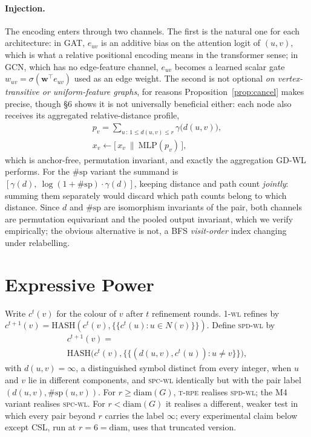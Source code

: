 \documentclass[11pt]{article}
\newcommand{\WL}{\textsc{1-wl}}
\newcommand{\SPD}{\textsc{spd-wl}}
\newcommand{\SPC}{\textsc{spc-wl}}
\newcommand{\TRPE}{\textsc{t-rpe}}
\begin{document}
\paragraph{Injection.}
The encoding enters through two channels. The first is the natural one for each architecture: in
GAT, $e_{uv}$ is an additive bias on the attention logit of $(u,v)$, which is what a relative
positional encoding means in the transformer sense; in GCN, which has no edge-feature channel,
$e_{uv}$ becomes a learned scalar gate $w_{uv}=\sigma(\mathbf{w}^\top e_{uv})$ used as an edge
weight. The second is not optional \emph{on vertex-transitive or uniform-feature graphs}, for
reasons Proposition~\ref{prop:cancel} makes precise, though \S6 shows it is not universally
beneficial either: each node also receives its aggregated relative-distance profile,
\begin{gather*}
p_v=\!\!\sum_{u\,:\,1\le d(u,v)\le r}\!\!\gamma\big(d(u,v)\big),\\
x_v\leftarrow\big[\,x_v\ \|\ \mathrm{MLP}(p_v)\,\big],
\end{gather*}
which is anchor-free, permutation invariant, and exactly the aggregation GD-WL performs. For the
$\#\mathrm{sp}$ variant the summand is $[\gamma(d),\ \log(1+\#\mathrm{sp})\cdot\gamma(d)]$,
keeping distance and path count \emph{jointly}: summing them separately would discard which path
counts belong to which distance. Since $d$ and $\#\mathrm{sp}$ are isomorphism invariants of the
pair, both channels are permutation equivariant and the pooled output invariant, which we verify
empirically; the obvious alternative is not, a BFS \emph{visit-order} index changing under
relabelling.

\section{Expressive Power}
\label{sec:theory}

Write $c^t(v)$ for the colour of $v$ after $t$ refinement rounds. \WL{} refines by
$c^{t+1}(v)=\mathrm{HASH}(c^t(v),\{\!\{c^t(u):u\in N(v)\}\!\})$. Define \SPD{} by
\begin{multline*}
c^{t+1}(v)=\\
\mathrm{HASH}\big(c^t(v),\{\!\{(d(u,v),c^t(u)):u\neq v\}\!\}\big),
\end{multline*}
with $d(u,v)=\infty$, a distinguished symbol distinct from every integer, when $u$ and $v$ lie in
different components, and \SPC{} identically but with the pair label
$(d(u,v),\#\mathrm{sp}(u,v))$. For $r\ge\mathrm{diam}(G)$, \TRPE{} realises \SPD{}; the M4
variant realises \SPC{}. For $r<\mathrm{diam}(G)$ it realises a different, weaker test in which
every pair beyond $r$ carries the label $\infty$; every experimental claim below except CSL, run
at $r=6=\mathrm{diam}$, uses that truncated version.
\end{document}
